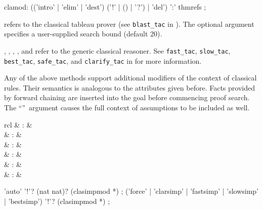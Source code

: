 \begin{isabellebody}
\begin{isamarkuptext}
\begin{rail}
    clamod: (('intro' | 'elim' | 'dest') ('!' | () | '?') | 'del') ':' thmrefs
    ;
  \end{rail}

  \begin{descr}

  \item [\mbox{\isa{blast}}] refers to the classical tableau prover (see
  \verb|blast_tac| in \cite[\S11]{isabelle-ref}).  The optional
  argument specifies a user-supplied search bound (default 20).

  \item [\mbox{\isa{fast}}, \mbox{\isa{slow}}, \mbox{\isa{best}}, \mbox{\isa{safe}}, and \mbox{\isa{clarify}}] refer to the generic classical
  reasoner.  See \verb|fast_tac|, \verb|slow_tac|, \verb|best_tac|, \verb|safe_tac|, and \verb|clarify_tac| in \cite[\S11]{isabelle-ref} for
  more information.

  \end{descr}

  Any of the above methods support additional modifiers of the context
  of classical rules.  Their semantics is analogous to the attributes
  given before.  Facts provided by forward chaining are inserted into
  the goal before commencing proof search.  The ``\isa{{\isachardoublequote}{\isacharbang}{\isachardoublequote}}''~argument causes the full context of assumptions to be
  included as well.%
\end{isamarkuptext}%
\isamarkuptrue%
%
\isamarkuptrue%
%
\begin{isamarkuptext}%
\begin{matharray}{rcl}
    \mbox{} & : & \isarmeth \\
    \mbox{} & : & \isarmeth \\
    \mbox{} & : & \isarmeth \\
    \mbox{} & : & \isarmeth \\
    \mbox{} & : & \isarmeth \\
    \mbox{} & : & \isarmeth \\
  \end{matharray}

  \begin{rail}
    'auto' '!'? (nat nat)? (clasimpmod *)
    ;
    ('force' | 'clarsimp' | 'fastsimp' | 'slowsimp' | 'bestsimp') '!'? (clasimpmod *)
    ;


\end{rail}
\end{isamarkuptext}
\end{isabellebody}
